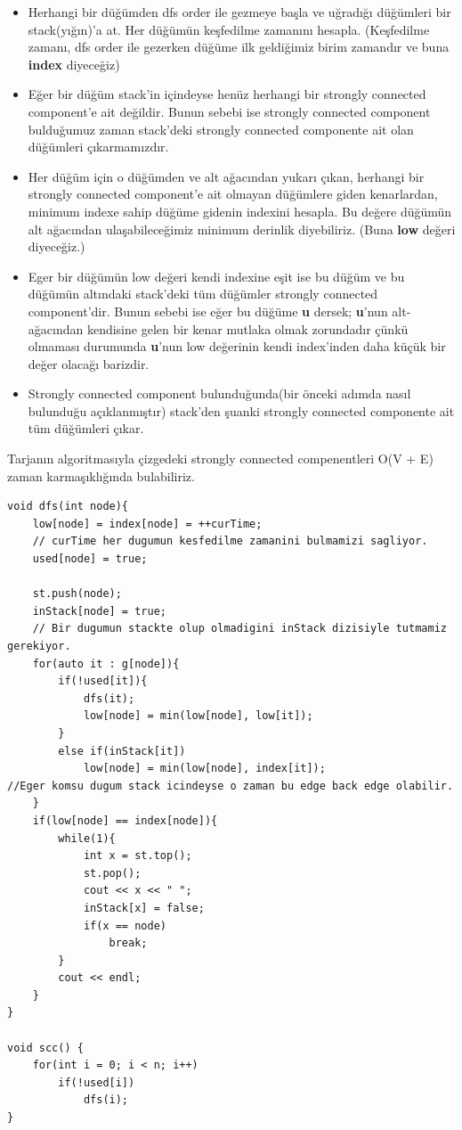 \documentclass[12pt]{article}
\begin{document}
\begin{itemize}
	\item Herhangi bir düğümden dfs order ile gezmeye başla ve uğradığı düğümleri bir stack(yığın)'a at. Her düğümün keşfedilme zamanını hesapla. (Keşfedilme zamanı, dfs order ile gezerken düğüme ilk geldiğimiz birim zamandır ve buna \textbf{index} diyeceğiz)
	\item Eğer bir düğüm stack'in içindeyse henüz herhangi bir strongly connected component'e ait değildir. Bunun sebebi ise strongly connected component bulduğumuz zaman stack'deki strongly connected componente ait olan düğümleri çıkarmamızdır.
	\item Her düğüm için o düğümden ve alt ağacından yukarı çıkan, herhangi bir strongly connected component'e ait olmayan düğümlere giden kenarlardan, minimum indexe sahip düğüme gidenin indexini hesapla. Bu değere düğümün alt ağacından ulaşabileceğimiz minimum derinlik diyebiliriz. (Buna \textbf{low} değeri diyeceğiz.)
	\item Eger bir düğümün low değeri kendi indexine eşit ise bu düğüm ve bu düğümün altındaki stack'deki tüm düğümler strongly connected component'dir. Bunun sebebi ise eğer bu düğüme \textbf{u} dersek; \textbf{u}'nun alt-ağacından kendisine gelen bir kenar mutlaka olmak zorundadır çünkü olmaması durumunda \textbf{u}'nun low değerinin kendi index'inden daha küçük bir değer olacağı barizdir.
	\item Strongly connected component bulunduğunda(bir önceki adımda nasıl bulunduğu açıklanmıştır) stack'den şuanki strongly connected componente ait tüm düğümleri çıkar.
\end{itemize}

Tarjanın algoritmasıyla çizgedeki strongly connected compenentleri O(V + E) zaman karmaşıklığında bulabiliriz.
    
      \begin{verbatim}
void dfs(int node){
	low[node] = index[node] = ++curTime;
	// curTime her dugumun kesfedilme zamanini bulmamizi sagliyor.
	used[node] = true;

	st.push(node);
	inStack[node] = true;
    // Bir dugumun stackte olup olmadigini inStack dizisiyle tutmamiz gerekiyor.
	for(auto it : g[node]){
		if(!used[it]){
			dfs(it);
			low[node] = min(low[node], low[it]);
		}
		else if(inStack[it])
			low[node] = min(low[node], index[it]);
//Eger komsu dugum stack icindeyse o zaman bu edge back edge olabilir.
	}
	if(low[node] == index[node]){
		while(1){
			int x = st.top();
			st.pop();
			cout << x << " ";
			inStack[x] = false;
			if(x == node)
				break;
		}
		cout << endl;
	}
}

void scc() {
	for(int i = 0; i < n; i++)
		if(!used[i])
			dfs(i);
}
    \end{verbatim}
    \cleardoublepage
    
\end{document}
